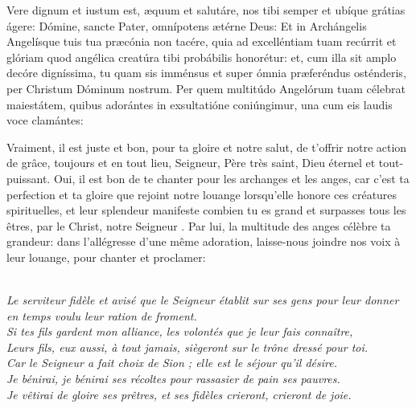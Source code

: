 \documentclass[twoside]{article}
\begin{document}
\begin{paracol}{2}
\switchcolumn
\switchcolumn*

Vere dignum et iustum est, æquum et salutáre,
nos tibi semper et ubíque grátias ágere:
Dómine, sancte Pater, omnípotens ætérne Deus:
Et in Archángelis Angelísque tuis tua præcónia non tacére,
quia ad excelléntiam tuam recúrrit et glóriam
quod angélica creatúra tibi probábilis honorétur:
et, cum illa sit amplo decóre digníssima,
tu quam sis imménsus et super ómnia præferéndus osténderis,
per Christum Dóminum nostrum.
Per quem multitúdo Angelórum tuam célebrat maiestátem,
quibus adorántes in exsultatióne coniúngimur,
una cum eis laudis voce clamántes:

\switchcolumn

Vraiment, il est juste et bon, pour ta gloire et notre salut,
de t'offrir notre action de grâce, toujours et en tout lieu,
Seigneur, Père très saint, Dieu éternel et tout-puissant.
Oui, il est bon de te chanter pour les archanges et les anges,
car c'est ta perfection et ta gloire que rejoint notre louange
lorsqu'elle honore ces créatures spirituelles,
et leur splendeur manifeste combien tu es grand
et surpasses tous les êtres,
par le Christ, notre Seigneur .
Par lui, la multitude des anges célèbre ta grandeur:
dans l'allégresse d'une même adoration,
laisse-nous joindre nos voix à leur louange,
pour chanter et proclamer:

\end{paracol}



 
\\
\emph{\rr Le serviteur fidèle et avisé que le Seigneur établit sur ses gens pour leur donner en temps voulu leur ration de froment.\\
\vv {} Si tes fils gardent mon alliance, les volontés que je leur fais connaître,\\
\vv {} Leurs fils, eux aussi, à tout jamais, siègeront sur le trône dressé pour toi.\\
\vv {} Car le Seigneur a fait choix de Sion ; elle est le séjour qu'il désire.\\
\vv {} Je bénirai, je bénirai ses récoltes pour rassasier de pain ses pauvres.\\
\vv {} Je vêtirai de gloire ses prêtres, et ses fidèles crieront, crieront de joie.
}
\end{document}
